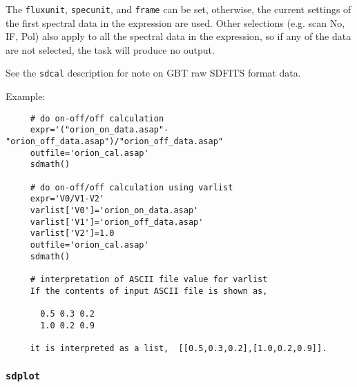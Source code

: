 The {\tt fluxunit}, {\tt specunit}, and {\tt frame} can be set, otherwise, the current
settings of the first spectral data in the expression are used.  
Other selections (e.g. scan No, IF, Pol) also apply to all 
the spectral data in the expression, so if any of the data are
not selected, the task will produce no output. 
     
See the {\tt sdcal} description for note on GBT raw SDFITS format data.

Example:
\begin{verbatim}
     # do on-off/off calculation
     expr='("orion_on_data.asap"-"orion_off_data.asap")/"orion_off_data.asap"
     outfile='orion_cal.asap'
     sdmath()
     
     # do on-off/off calculation using varlist
     expr='V0/V1-V2'
     varlist['V0']='orion_on_data.asap'
     varlist['V1']='orion_off_data.asap'
     varlist['V2']=1.0
     outfile='orion_cal.asap'
     sdmath()
     
     # interpretation of ASCII file value for varlist
     If the contents of input ASCII file is shown as,

       0.5 0.3 0.2
       1.0 0.2 0.9

     it is interpreted as a list,  [[0.5,0.3,0.2],[1.0,0.2,0.9]].
\end{verbatim}


\subsubsection{{\tt sdplot}}
\label{section:sd.sdtasks.tasks.sdplot}

